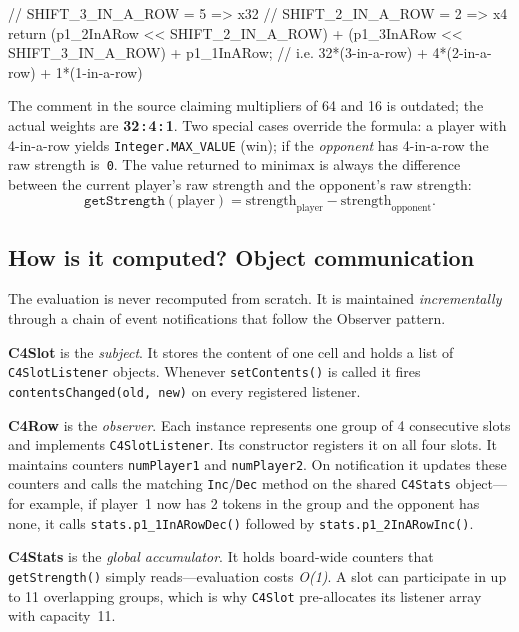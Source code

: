 \documentclass[language=english,titlepage=false,smartquotes=true]{hgbreport}
\begin{document}
\begin{JavaCode}[numbers=none]
// SHIFT_3_IN_A_ROW = 5  =>  x32
// SHIFT_2_IN_A_ROW = 2  =>  x4
return (p1_2InARow << SHIFT_2_IN_A_ROW)
     + (p1_3InARow << SHIFT_3_IN_A_ROW)
     + p1_1InARow;
// i.e. 32*(3-in-a-row) + 4*(2-in-a-row) + 1*(1-in-a-row)
\end{JavaCode}

The comment in the source claiming multipliers of 64 and 16 is outdated; the
actual weights are \textbf{32\,:\,4\,:\,1}. Two special cases override the
formula: a player with 4-in-a-row yields \texttt{Integer.MAX\_VALUE} (win);
if the \emph{opponent} has 4-in-a-row the raw strength is~\texttt{0}.
The value returned to minimax is always the difference between the current
player's raw strength and the opponent's raw strength:
\[
  \texttt{getStrength}(\text{player}) =
      \text{strength}_{\text{player}} - \text{strength}_{\text{opponent}}.
\]

\subsection{How is it computed? Object communication}

The evaluation is never recomputed from scratch. It is maintained
\emph{incrementally} through a chain of event notifications that follow the
Observer pattern.

\textbf{C4Slot} is the \emph{subject}. It stores the content of one cell and
holds a list of \texttt{C4SlotListener} objects. Whenever \texttt{setContents()}
is called it fires \texttt{contentsChanged(old,~new)} on every registered
listener.

\textbf{C4Row} is the \emph{observer}. Each instance represents one group of
4 consecutive slots and implements \texttt{C4SlotListener}. Its constructor
registers it on all four slots. It maintains counters \texttt{numPlayer1} and
\texttt{numPlayer2}. On notification it updates these counters and calls the
matching \texttt{Inc}/\texttt{Dec} method on the shared \texttt{C4Stats}
object---for example, if player~1 now has 2 tokens in the group and the
opponent has none, it calls \texttt{stats.p1\_1InARowDec()} followed by
\texttt{stats.p1\_2InARowInc()}.

\textbf{C4Stats} is the \emph{global accumulator}. It holds board-wide
counters that \texttt{getStrength()} simply reads---evaluation costs
\emph{O(1)}. A slot can participate in up to 11 overlapping groups, which
is why \texttt{C4Slot} pre-allocates its listener array with capacity~11.
\end{document}

